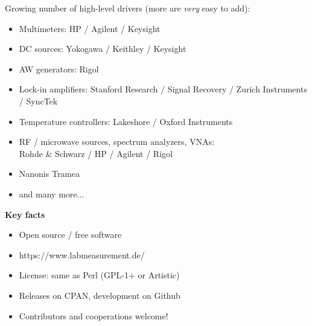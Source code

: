 \documentclass[portrait]{a0poster}
\newcommand{\lightblue}{\color{lightblue}}
\newcommand{\heading}[1]{
  {\color{heading}\boldmath\textbf{\huge #1}}\\[\medskipamount]
}
\begin{document}
{\begin{minipage}[t][\columnheighta-2\fboxsep-2\fboxrule][t]
\begin{minipage}{\textwidth}
\vspace*{1cm}
Growing number of high-level drivers (more are {\it very} easy to add):
{\large
\begin{itemize}
\item Multimeters: HP / Agilent / Keysight
\item DC sources: Yokogawa / Keithley / Keysight
\item AW generators: Rigol
\item Lock-in amplifiers: Stanford Research / Signal Recovery / Zurich 
Instruments / SyncTek
\item Temperature controllers: Lakeshore / Oxford Instruments
\item RF / microwave sources, spectrum analyzers, VNAs: \\ Rohde \& Schwarz / 
HP / Agilent / Rigol
\item Nanonis Tramea
\item and many more...
\end{itemize}
}
\vspace*{1cm}
\heading{Key facts}
\vspace*{-2cm}
\begin{itemize}
 \item
 Open source / free software\\[-5cm]
 \item 
 {\lightblue https://www.labmeasurement.de/}
 \hfill{}
 \item
 License: same as Perl (GPL-1+ or Artistic)
 \item
 Releases on CPAN, development on Github
 \item
 Contributors and cooperations welcome!
\end{itemize}

%
%
%
\end{minipage}
\end{minipage}}
%
%
\end{document}
